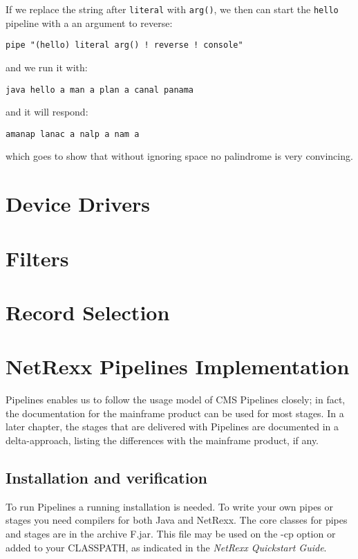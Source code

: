 If we replace the string after \texttt{literal} with \texttt{arg()},
we then can start the \texttt{hello} pipeline with a an argument to
reverse:
\begin{shaded}
\begin{verbatim}
pipe "(hello) literal arg() ! reverse ! console"
\end{verbatim}
\end{shaded}
 and we run it with:
\begin{verbatim}
java hello a man a plan a canal panama
\end{verbatim}
and it will respond:
\begin{verbatim}
amanap lanac a nalp a nam a
\end{verbatim}
which goes to show that without ignoring space no palindrome is very convincing.
\chapter{Device Drivers}
\chapter{Filters}
\chapter{Record Selection}


\chapter{NetRexx Pipelines Implementation}
\nr{} Pipelines enables us to follow the usage model of CMS Pipelines
closely; in fact, the documentation for the mainframe product can be
used for most stages. In a later chapter, the stages that are
delivered with \nr{} Pipelines are documented in a delta-approach, listing the differences with the mainframe product, if any.

\section{Installation and verification}
To run \nr{} Pipelines a running \nr{} installation is needed.  To write your own pipes or stages you need compilers for both Java and NetRexx. 
The core classes for pipes and stages are in the archive \nr{}F.jar.  This file may
be used on the -cp option or added to your CLASSPATH, as indicated in
the \emph{NetRexx Quickstart Guide}.

